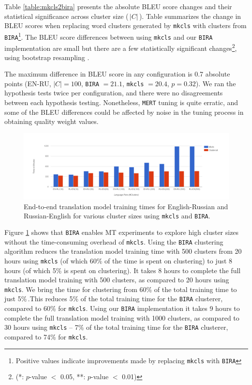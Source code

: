 Table \ref{table:mkcls2bira} presents the absolute BLEU score changes and their statistical significance across cluster size (\,$|C|$\,).  Table \label{table:deltabira} summarizes the change in BLEU scores when replacing word clusters generated by \texttt{mkcls} with clusters from \texttt{BIRA}\footnote{Positive values indicate improvements made by replacing   \texttt{mkcls} with \texttt{BIRA}}. The BLEU score differences between using {\tt mkcls} and our {\tt BIRA} implementation are small but there are a few statistically significant changes\footnote{(*: $p$-value $<$ 0.05, **: $p$-value $<$ 0.01)}, using bootstrap resampling \cite{koehn2004significance}.

The maximum difference in BLEU score in any configuration is 0.7 absolute points (EN-RU, $|C|=100$, \texttt{BIRA} $=21.1$, {\tt mkcls} $= 20.4$, $p=0.32$). We ran the hypothesis tests twice per configuration, and there were no disagreements between each hypothesis testing. Nonetheless, \texttt{MERT} tuning is quite erratic, and some of the BLEU differences could be affected by noise in the tuning process in obtaining quality weight values.


\begin{figure}[!htb]
	\includegraphics[width=\textwidth]{images/mt-training-times.png} 
	\caption{End-to-end translation model training times for English-Russian and Russian-English for various cluster sizes using \texttt{mkcls} and \texttt{BIRA}.}
	\label{fig-mt-training-times}
\end{figure}

Figure \ref{fig-mt-training-times} shows that \texttt{BIRA} enables MT experiments to explore high cluster sizes without the time-consuming overhead of \texttt{mkcls}. Using the {\tt BIRA} clustering algorithm reduces the translation model training time with 500 clusters from 20 hours using {\tt mkcls} (of which 60\% of the time is spent on clustering) to just 8 hours (of which 5\% is spent on clustering). It takes 8 hours to complete the full translation model training with 500 clusters, as compared to 20 hours using {\tt mkcls}. We bring the time for clustering from 60\% of the total training time to just 5\%\,.This reduces 5\% of the total training time for the {\tt BIRA} clusterer, compared to 60\% for {\tt mkcls}. Using our {\tt BIRA} implementation it takes 9 hours to complete the full translation model training with 1000 clusters, as compared to 30 hours using {\tt mkcls} -- 7\% of the total training time for the {\tt BIRA} clusterer, compared to 74\% for {\tt mkcls}.

